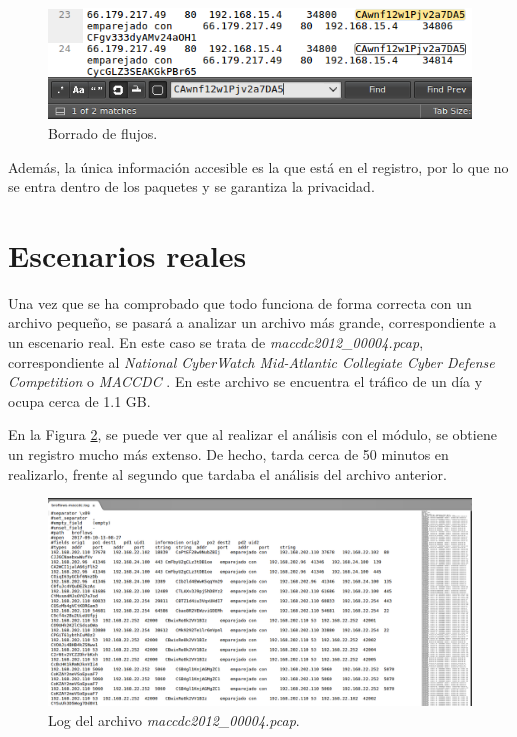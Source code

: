 \begin{figure}[H]
  \includegraphics[width=1\textwidth]{imagenes/borrado.png}
  \centering
  \caption{Borrado de flujos.}\label{fig.borrado}
\end{figure}

\intro Además, la única información accesible es la que está en el registro, por lo que no se entra dentro de los paquetes y se 
garantiza la privacidad.

\section{Escenarios reales}

Una vez que se ha comprobado que todo funciona de forma correcta con un archivo pequeño, se pasará a analizar un archivo más grande, 
correspondiente a un escenario real. En este caso se trata de \textit{maccdc2012\_00004.pcap}, correspondiente al \textit{National 
CyberWatch Mid-Atlantic Collegiate Cyber Defense Competition} o \textit{MACCDC} \cite{maccdc}. En este archivo se encuentra el tráfico 
de un día y ocupa cerca de 1.1 GB.

\intro En la Figura \ref{fig.logmaccdc}, se puede ver que al realizar el análisis con el módulo, se obtiene un registro mucho más 
extenso. De hecho, tarda cerca de 50 minutos en realizarlo, frente al segundo que tardaba el análisis del archivo anterior.

\begin{figure}[H]
  \includegraphics[width=1\textwidth]{imagenes/logmaccdc.png}
  \centering
  \caption{Log del archivo \textit{maccdc2012\_00004.pcap}.}\label{fig.logmaccdc}
\end{figure}

